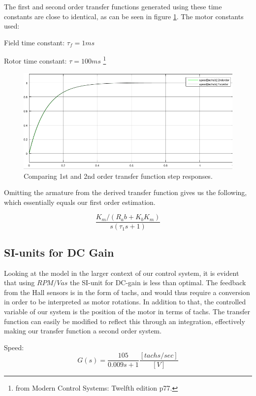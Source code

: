 The first and second order transfer functions generated using these time constants are close to identical, as can be seen in figure \ref{fig:1st2ndorderstep}. The motor constants used:

Field time constant: $\tau_f = 1ms$ 

Rotor time constant: $\tau = 100ms$ \footnote{from Modern Control Systems: Twelfth edition p77.} 

\begin{figure}[h!]
\centering
\includegraphics[scale=0.6]{Billeder/1st2ndorderstep.png}
\caption{Comparing 1st and 2nd order transfer function step responses.}
\label{fig:1st2ndorderstep}
\end{figure}

Omitting the armature from the derived transfer function gives us the following, which essentially equals our first order estimation.

\begin{equation}
\frac{K_m /(R_a b+K_b K_m )}{s(\tau_1 s +1)}
\end{equation}

\subsection{SI-units for DC Gain}
Looking at the model in the larger context of our control system, it is evident that using $RPM/Vas$ the SI-unit for DC-gain is less than optimal. The feedback from the Hall sensors is in the form of tachs, and would thus require a conversion in order to be interpreted as motor rotations. In addition to that, the controlled variable of our system is the position of the motor in terms of tachs. The transfer function can easily be modified to reflect this through an integration, effectively making our transfer function a second order system.

Speed:
\begin{equation}
G(s)=\frac{105}{0.009s+1} \frac{[tachs/sec]}{[V]}
\end{equation}


